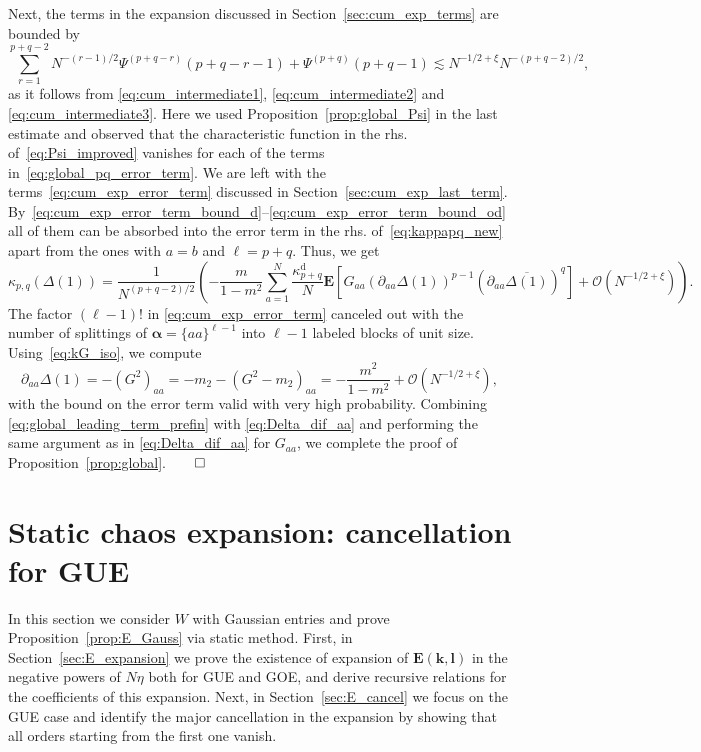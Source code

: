 \documentclass[10pt]{amsart}
\numberwithin{equation}{section}
\newcommand{\dif}{\mathrm{d}}
\newcommand{\E}{\mathbf{E}}
\begin{document}
Next, the terms in the expansion discussed in Section~\ref{sec:cum_exp_terms} are bounded by
\begin{equation}
\sum_{r=1}^{p+q-2}N^{-(r-1)/2} \Psi^{(p+q-r)}(p+q-r-1) + \Psi^{(p+q)}(p+q-1) \lesssim N^{-1/2+\xi} N^{-(p+q-2)/2},
\label{eq:global_pq_error_term}
\end{equation}
as it follows from \eqref{eq:cum_intermediate1}, \eqref{eq:cum_intermediate2} and \eqref{eq:cum_intermediate3}. Here we used Proposition~\ref{prop:global_Psi} in the last estimate and observed that the characteristic function in the rhs. of~\eqref{eq:Psi_improved} vanishes for each of the terms in~\eqref{eq:global_pq_error_term}. We are left with the terms~\eqref{eq:cum_exp_error_term} discussed in Section~\ref{sec:cum_exp_last_term}. By~\eqref{eq:cum_exp_error_term_bound_d}--\eqref{eq:cum_exp_error_term_bound_od} all of them can be absorbed into the error term in the rhs. of~\eqref{eq:kappapq_new} apart from the ones with $a=b$ and $\ell=p+q$. Thus, we get
\begin{equation}
\kappa_{p,q}(\Delta(1)) = \frac{1}{N^{(p+q-2)/2}}\left(-\frac{m}{1-m^2}\sum_{a=1}^N\frac{\kappa_{p+q}^{\dif}}{N}\E\left[G_{aa} \left(\partial_{aa}\Delta(1)\right)^{p-1}\left(\partial_{aa}\overline{\Delta(1)}\right)^{q}\right] + \mathcal{O}\left(N^{-1/2+\xi}\right)\!\right)\!.
\label{eq:global_leading_term_prefin}
\end{equation}
The factor $(\ell-1)!$ in \eqref{eq:cum_exp_error_term} canceled out with the number of splittings of $\bm{\alpha}=\{aa\}^{\ell-1}$ into $\ell-1$ labeled blocks of unit size. Using~\eqref{eq:kG_iso}, we compute
\begin{equation}
\partial_{aa}\Delta(1) = - (G^2)_{aa} = -m_2 -(G^2-m_2)_{aa} = -\frac{m^2}{1-m^2} + \mathcal{O}\left(N^{-1/2+\xi}\right),
\label{eq:Delta_dif_aa}
\end{equation}
with the bound on the error term valid with very high probability. Combining \eqref{eq:global_leading_term_prefin} with \eqref{eq:Delta_dif_aa} and performing the same argument as in \eqref{eq:Delta_dif_aa} for $G_{aa}$, we complete the proof of Proposition~\ref{prop:global}.\hfill$\qed$ 



\section{Static chaos expansion: cancellation for GUE}\label{sec:Gauss}

In this section we consider $W$ with Gaussian entries and prove Proposition~\ref{prop:E_Gauss} via static method. First, in Section~\ref{sec:E_expansion} we prove the existence of expansion of $\E(\bm{k},\bm{l})$ in the negative powers of $N\eta$ both for GUE and GOE, and derive recursive relations for the coefficients of this expansion. Next, in Section~\ref{sec:E_cancel} we focus on the GUE case and identify the major cancellation in the expansion by showing that all orders starting from the first one vanish. 
\end{document}

